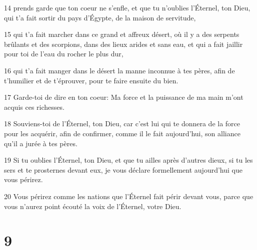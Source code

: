 \par 14 prends garde que ton coeur ne s'enfle, et que tu n'oublies l'Éternel, ton Dieu, qui t'a fait sortir du pays d'Égypte, de la maison de servitude,
\par 15 qui t'a fait marcher dans ce grand et affreux désert, où il y a des serpents brûlants et des scorpions, dans des lieux arides et sans eau, et qui a fait jaillir pour toi de l'eau du rocher le plus dur,
\par 16 qui t'a fait manger dans le désert la manne inconnue à tes pères, afin de t'humilier et de t'éprouver, pour te faire ensuite du bien.
\par 17 Garde-toi de dire en ton coeur: Ma force et la puissance de ma main m'ont acquis ces richesses.
\par 18 Souviens-toi de l'Éternel, ton Dieu, car c'est lui qui te donnera de la force pour les acquérir, afin de confirmer, comme il le fait aujourd'hui, son alliance qu'il a jurée à tes pères.
\par 19 Si tu oublies l'Éternel, ton Dieu, et que tu ailles après d'autres dieux, si tu les sers et te prosternes devant eux, je vous déclare formellement aujourd'hui que vous périrez.
\par 20 Vous périrez comme les nations que l'Éternel fait périr devant vous, parce que vous n'aurez point écouté la voix de l'Éternel, votre Dieu.

\chapter{9}

